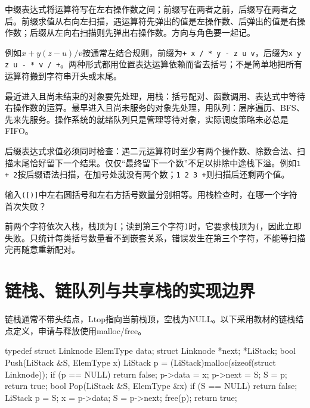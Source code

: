 中缀表达式将运算符写在左右操作数之间；前缀写在两者之前，后缀写在两者之后。前缀求值从右向左扫描，遇运算符先弹出的值是左操作数、后弹出的值是右操作数；后缀从左向右扫描则先弹出右操作数。方向与角色要一起记。

例如\(x+y(z-u)/v\)按通常左结合规则，前缀为\texttt{+\allowbreak{} x /\allowbreak{} *\allowbreak{} y - z u v}，后缀为\texttt{x y z u - *\allowbreak{} v /\allowbreak{} +\allowbreak{}}。两种形式都用位置表达运算依赖而省去括号；不是简单地把所有运算符搬到字符串开头或末尾。

\begin{methodbox}[按尚未完成对象的次序选结构]

最近进入且尚未结束的对象要先处理，用栈：括号配对、函数调用、表达式中等待右操作数的运算。最早进入且尚未服务的对象先处理，用队列：层序遍历、BFS、先来先服务。操作系统的就绪队列只是管理等待对象，实际调度策略未必总是FIFO。

\end{methodbox}

后缀表达式求值必须同时检查：遇二元运算符时至少有两个操作数、除数合法、扫描末尾恰好留下一个结果。仅仅``最终留下一个数''不足以排除中途栈下溢。例如\texttt{1 +\allowbreak{} 2}按后缀语法扫描，在加号处就没有两个数；\texttt{1 2 3 +\allowbreak{}}则扫描后还剩两个值。

\begin{example}[自拟：括号数量正确仍可失败]

输入\texttt{(\allowbreak{}[\allowbreak{})\allowbreak{}]\allowbreak{}}中左右圆括号和左右方括号数量分别相等。用栈检查时，在哪一个字符首次失败？

\end{example}

前两个字符依次入栈，栈顶为\texttt{[\allowbreak{}}；读到第三个字符\texttt{)\allowbreak{}}时，它要求栈顶为\texttt{(\allowbreak{}}，因此立即失败。只统计每类括号数量看不到嵌套关系，错误发生在第三个字符，不能等扫描完再随意重新配对。

\section{链栈、链队列与共享栈的实现边界}\label{DS03-linked-code}

链栈通常不带头结点，Ltop指向当前栈顶，空栈为NULL。以下采用教材的链栈结点定义，申请与释放使用malloc/free。

\par\medskip\noindent\begin{minipage}{\linewidth}
\begin{codeblock}[language=C++]
typedef struct Linknode {
    ElemType data;
    struct Linknode *next;
} *LiStack;
bool Push(LiStack &S, ElemType x) {
    LiStack p = (LiStack)malloc(sizeof(struct Linknode));
    if (p == NULL) return false;
    p->data = x;
    p->next = S;
    S = p;
    return true;
}
bool Pop(LiStack &S, ElemType &x) {
    if (S == NULL) return false;
    LiStack p = S;
    x = p->data;
    S = p->next;
    free(p);
    return true;
}
\end{codeblock}
\end{minipage}\par\medskip

